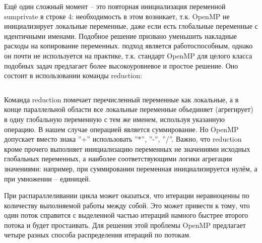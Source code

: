 Ещё один сложный момент – это повторная инициализация переменной sum\textunderscore private в строке 4: необходимость в этом возникает, т.к. OpenMP не инициализирует локальные переменные, даже если есть глобальные переменные с идентичными именами. Подобное решение призвано уменьшить накладные расходы на копирование переменных.
 подход является работоспособным, однако он почти не используется на практике, т.к. стандарт OpenMP для целого класса подобных задач предлагает более высокоуровневое и простое решение. Оно состоит в использовании команды reduction:

\inputminted{c++}{listings/OpenMPExample12.cpp}

Команда reduction помечает перечисленный переменные как локальные, а в конце параллельной области все локальные переменные объединяет (агрегирует) в одну глобальную переменную с тем же именем, используя указанную операцию. В нашем случае операцией является суммирование. Но OpenMP допускает вместо знака ''+'' использовать ''*'', ''-'', ''/''. Важно, что reduction кроме прочего выполняет инициализацию переменных не значениями исходных глобальных переменных, а наиболее соответствующими логики агрегации значениями: например, при суммировании переменная инициализируется нулём, а при умножении – единицей.

При распараллеливании цикла может оказаться, что итерации не\-рав\-но\-цен\-ны по количеству выполняемой работы между собой. Это может привести к тому, что один поток справится с выделенной частью итераций намного быстрее второго потока и будет простаивать. Для решения этой проблемы OpenMP предлагает четыре разных способа распределения итераций по потокам. 

